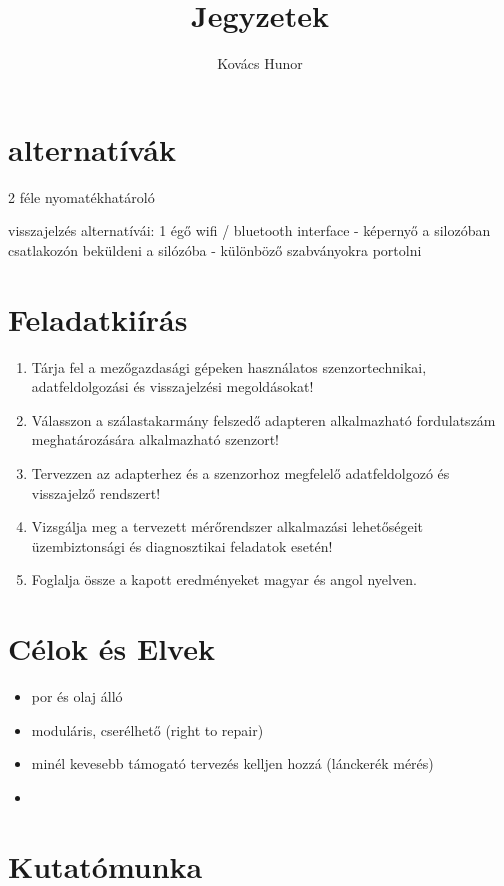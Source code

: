\documentclass{article}
\title{Jegyzetek}
\author{Kovács Hunor}
\begin{document}
	\maketitle
	
	\section{alternatívák}
	
	2 féle nyomatékhatároló
	
	visszajelzés alternatívái:
	1 égő
	wifi / bluetooth interface - képernyő a silozóban
	csatlakozón beküldeni a silózóba - különböző szabványokra portolni
	
	\section{Feladatkiírás}
	
	\begin{enumerate}
		
		\item Tárja fel a mezőgazdasági gépeken használatos szenzortechnikai, adatfeldolgozási és visszajelzési megoldásokat!
		\item Válasszon a szálastakarmány felszedő adapteren alkalmazható fordulatszám meghatározására alkalmazható szenzort!
		\item Tervezzen az adapterhez és a szenzorhoz megfelelő adatfeldolgozó és visszajelző rendszert!
		\item Vizsgálja meg a tervezett mérőrendszer alkalmazási lehetőségeit üzembiztonsági és diagnosztikai feladatok esetén!
		\item Foglalja össze a kapott eredményeket magyar és angol nyelven.
	\end{enumerate}
	
	\section{Célok és Elvek}
	
	\begin{itemize}
		\item por és olaj álló
		\item moduláris, cserélhető (right to repair)
		\item minél kevesebb támogató tervezés kelljen hozzá (lánckerék mérés)
		\item 
	\end{itemize}
	
	\section{Kutatómunka}
\end{document}
